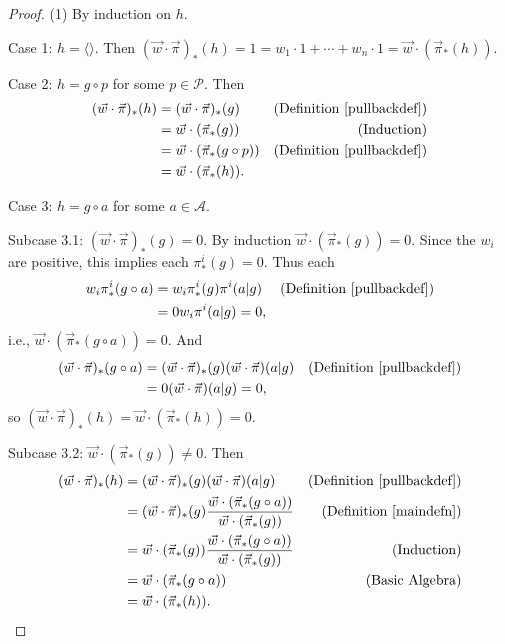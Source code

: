 \documentclass{article}
\begin{document}
\begin{proof}
    (1) By induction on $h$.

    Case 1: $h=\langle\rangle$. Then
    $(\vec w\cdot\vec\pi)_*(h)=1=w_1\cdot 1+\cdots+w_n\cdot 1
    =\vec w\cdot (\vec\pi_*(h))$.

    Case 2: $h=g\circ p$ for some $p\in\mathcal P$. Then
    \begin{align*}
        (\vec w\cdot \vec\pi)_*(h)
            &= (\vec w\cdot\vec\pi)_*(g)
                &\mbox{(Definition \ref{pullbackdef})}\\
            &= \vec w\cdot(\vec\pi_*(g))
                &\mbox{(Induction)}\\
            &= \vec w\cdot(\vec\pi_*(g\circ p))
                &\mbox{(Definition \ref{pullbackdef})}\\
            &= \vec w\cdot(\vec\pi_*(h)).
    \end{align*}

    Case 3: $h=g\circ a$ for some $a\in\mathcal A$.

    Subcase 3.1: $(\vec w\cdot \vec\pi)_*(g)=0$.
        By induction $\vec w\cdot(\vec\pi_*(g))=0$.
        Since the $w_i$ are positive, this implies
        each $\pi^i_*(g)=0$.
        Thus each
        \begin{align*}
            w_i\pi^i_*(g\circ a)
                &= w_i\pi^i_*(g)\pi^i(a|g)
                    &\mbox{(Definition \ref{pullbackdef})}\\
                &= 0w_i\pi^i(a|g)=0,
        \end{align*}
        i.e., $\vec w\cdot(\vec\pi_*(g\circ a))=0$.
        And
        \begin{align*}
            (\vec w\cdot\vec\pi)_*(g\circ a)
                &= (\vec w\cdot\vec\pi)_*(g)(\vec w\cdot\vec\pi)(a|g)
                    &\mbox{(Definition \ref{pullbackdef})}\\
                &= 0(\vec w\cdot\vec\pi)(a|g) = 0,
        \end{align*}
        so $(\vec w\cdot\vec\pi)_*(h)=\vec w\cdot(\vec \pi_*(h))=0$.

    Subcase 3.2: $\vec w\cdot (\vec\pi_*(g))\not=0$. Then
    \begin{align*}
        (\vec w\cdot\vec\pi)_*(h)
            &= (\vec w\cdot\vec\pi)_*(g)(\vec w\cdot\vec\pi)(a|g)
                &\mbox{(Definition \ref{pullbackdef})}\\
            &= (\vec w\cdot\vec\pi)_*(g)
                \frac
                {\vec w\cdot(\vec\pi_*(g\circ a))}
                {\vec w\cdot(\vec\pi_*(g))}
                &\mbox{(Definition \ref{maindefn})}\\
            &= \vec w\cdot(\vec\pi_*(g))
                \frac
                {\vec w\cdot(\vec\pi_*(g\circ a))}
                {\vec w\cdot(\vec\pi_*(g))}
                &\mbox{(Induction)}\\
            &= \vec w\cdot(\vec\pi_*(g\circ a))
                &\mbox{(Basic Algebra)}\\
            &= \vec w\cdot(\vec\pi_*(h)).
    \end{align*}


\end{proof}
\end{document}
